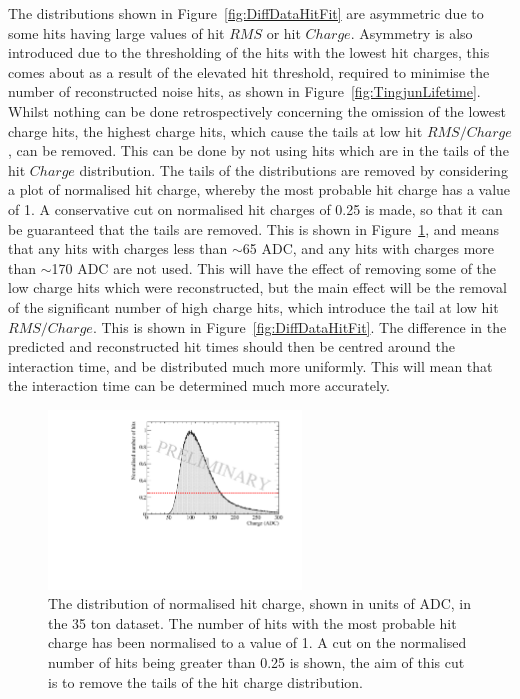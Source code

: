 The distributions shown in Figure~\ref{fig:DiffDataHitFit} are asymmetric due to some hits having large values of hit $RMS$ or hit $Charge$. Asymmetry is also introduced due to the thresholding of the hits with the lowest hit charges, this comes about as a result of the elevated hit threshold, required to minimise the number of reconstructed noise hits, as shown in Figure~\ref{fig:TingjunLifetime}. Whilst nothing can be done retrospectively concerning the omission of the lowest charge hits, the highest charge hits, which cause the tails at low hit $RMS/Charge$, can be removed. This can be done by not using hits which are in the tails of the hit $Charge$ distribution. The tails of the distributions are removed by considering a plot of normalised hit charge, whereby the most probable hit charge has a value of 1. A conservative cut on normalised hit charges of 0.25 is made, so that it can be guaranteed that the tails are removed. This is shown in Figure~\ref{fig:DiffData_ChargeCut}, and means that any hits with charges less than $\sim$65 ADC, and any hits with charges more than $\sim$170 ADC are not used. This will have the effect of removing some of the low charge hits which were reconstructed, but the main effect will be the removal of the significant number of high charge hits, which introduce the tail at low hit $RMS/Charge$. This is shown in Figure~\ref{fig:DiffDataHitFit}. The difference in the predicted and reconstructed hit times should then be centred around the interaction time, and be distributed much more uniformly. This will mean that the interaction time can be determined much more accurately. \\

\begin{figure}
  \centering
  \includegraphics[width=0.6\textwidth]{ChargeCutData}
  \caption[The distribution of normalised hit charge in the 35 ton dataset]
          {The distribution of normalised hit charge, shown in units of ADC, in the 35 ton dataset. The number of hits with the most probable hit charge has been normalised to a value of 1. A cut on the normalised number of hits being greater than 0.25 is shown, the aim of this cut is to remove the tails of the hit charge distribution.}
  \label{fig:DiffData_ChargeCut}
\end{figure}

